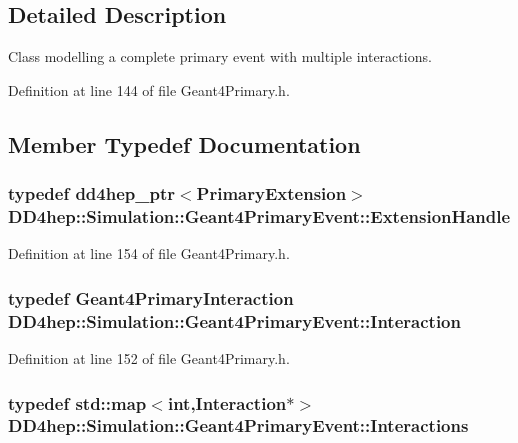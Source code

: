 \subsection{Detailed Description}
Class modelling a complete primary event with multiple interactions. 

Definition at line 144 of file Geant4Primary.h.

\subsection{Member Typedef Documentation}
\hypertarget{class_d_d4hep_1_1_simulation_1_1_geant4_primary_event_acfe0b3b7ad6f183fe75a6539b4470418}{
\subsubsection[{ExtensionHandle}]{\setlength{\rightskip}{0pt plus 5cm}typedef {\bf dd4hep\_\-ptr}$<${\bf PrimaryExtension}$>$ {\bf DD4hep::Simulation::Geant4PrimaryEvent::ExtensionHandle}}}
\label{class_d_d4hep_1_1_simulation_1_1_geant4_primary_event_acfe0b3b7ad6f183fe75a6539b4470418}


Definition at line 154 of file Geant4Primary.h.\hypertarget{class_d_d4hep_1_1_simulation_1_1_geant4_primary_event_afe42410b9331b521808a49120f402bd9}{
\subsubsection[{Interaction}]{\setlength{\rightskip}{0pt plus 5cm}typedef {\bf Geant4PrimaryInteraction} {\bf DD4hep::Simulation::Geant4PrimaryEvent::Interaction}}}
\label{class_d_d4hep_1_1_simulation_1_1_geant4_primary_event_afe42410b9331b521808a49120f402bd9}


Definition at line 152 of file Geant4Primary.h.\hypertarget{class_d_d4hep_1_1_simulation_1_1_geant4_primary_event_adae96b166507159c2dd92b4e20352a52}{
\subsubsection[{Interactions}]{\setlength{\rightskip}{0pt plus 5cm}typedef std::map$<$int,{\bf Interaction}$\ast$$>$ {\bf DD4hep::Simulation::Geant4PrimaryEvent::Interactions}}}
\label{class_d_d4hep_1_1_simulation_1_1_geant4_primary_event_adae96b166507159c2dd92b4e20352a52}



